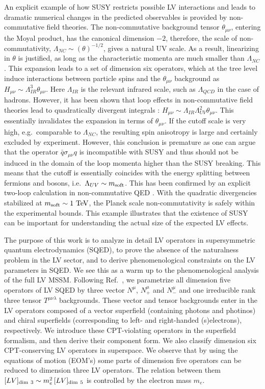 \documentclass[12pt]{revtex4}
\begin{document}
An explicit example of how SUSY restricts possible LV interactions and
leads to dramatic numerical changes in the predicted observables is
provided by non-commutative field theories. The non-commutative
background tensor $\theta_{\mu\nu}$, entering the Moyal product, has
the canonical dimension $-2$, therefore, the scale of non-commutativity,
$\Lambda_{NC} \sim(\theta)^{-1/2}$, gives a natural UV scale. 
As a result, linearizing in $\theta$ is justified, as long as the
characteristic momenta are much smaller than $\Lambda_{NC}$. 
This expansion leads to a set of dimension six operators, which at the
tree level induce interactions between particle spins and the 
$\theta_{\mu\nu}$ background \cite{MPR1} as 
$H_{\mu\nu} \sim\Lambda_{IR}^3\theta_{\mu\nu}$. 
Here $ \Lambda_{IR}$ is the relevant infrared scale, such as 
$\Lambda_{QCD}$ in the case of hadrons. However, it has been shown
that loop effects in non-commutative field theories lead to
quadratically divergent integrals \cite{UCSC}: 
$H_{\mu\nu} \sim \Lambda_{IR}\Lambda_{UV}^2\theta_{\mu\nu}$. 
This essentially invalidates the expansion in terms of $\theta_{\mu\nu}$. 
If the cutoff scale is very high, e.g.\ comparable to $\Lambda_{NC}$, 
the resulting spin anisotropy is large and certainly excluded by
experiment. However, this conclusion is premature as  
one can argue that the operator $\bar q \sigma_{\mu\nu} q$ 
is incompatible with SUSY \cite{MPR2} and thus should not be induced 
in the domain of the loop momenta higher than the SUSY breaking. 
This means that the cutoff is essentially coincides with the 
energy splitting between fermions and bosons, i.e.\ 
$\Lambda_{UV} \sim m_{\rm soft}$. 
This has been confirmed by an explicit two-loop calculation in
non-commutative QED \cite{WMC2}. With the quadratic divergencies
stabilized at $m_{\rm soft}\sim 1~{\rm TeV}$,
the Planck scale non-commutativity is safely within the experimental 
bounds. This example illustrates that the existence of SUSY can be
important for understanding the actual size of the expected LV effects. 


The purpose of this work is to analyze in detail LV operators in 
supersymmetric quantum electrodynamics (SQED), to prove 
the absence of the naturalness problem in the LV sector, and to derive
phenomenological  constraints on the LV parameters in SQED.  
We see this as a warm up to the phenomenological analysis of the full
LV MSSM.  Following Ref.\ \cite{GrootNibbelink:2004za}, we
parametrize all dimension five operators of LV SQED by three vector 
$N^{\mu}$, $N^{\mu}_+$ and $N^{\mu}_-$ and one irreducible 
rank three tensor $T^{\mu\nu\lambda}$ backgrounds. 
These vector and tensor backgrounds enter in the LV
operators composed  of a vector superfield (containing photons and
photinos) and chiral superfields (corresponding to left- and
right-handed (s)electrons), respectively. 
We introduce these CPT-violating operators in the superfield
formalism, and then derive their component form. We also classify
dimension six CPT-conserving LV operators in superspace. 
We observe that by using the equations of
motion (EOM's) some parts of dimension five operators can be 
reduced to dimension three LV operators. The relation  
between them
$[LV]_{\rm dim~3} \sim m_e^2\, [LV]_{\rm dim~5}$ 
is controlled by the electron mass $m_e$. 
\end{document}
